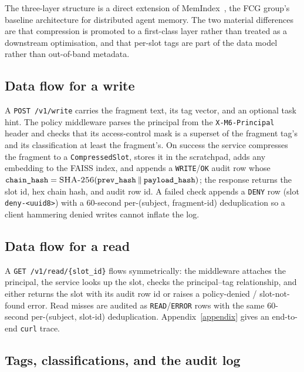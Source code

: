 The three-layer structure is a direct extension of
MemIndex~\cite{saleh2025memindex}, the FCG group's baseline architecture
for distributed agent memory. The two material differences are that
compression is promoted to a first-class layer rather than treated as
a downstream optimisation, and that per-slot tags are part of the
data model rather than out-of-band metadata.

\subsection{Data flow for a write}

A \texttt{POST /v1/write} carries the fragment text, its tag vector,
and an optional task hint. The policy middleware parses the principal
from the \texttt{X-M6-Principal} header and checks that its
access-control mask is a superset of the fragment tag's and its
classification at least the fragment's. On success the service
compresses the fragment to a \texttt{CompressedSlot}, stores it in
the scratchpad, adds any embedding to the FAISS index, and appends a
\texttt{WRITE}/\texttt{OK} audit row whose
$\texttt{chain\_hash}=\textsc{SHA-256}(\texttt{prev\_hash}\mathbin\Vert\texttt{payload\_hash})$;
the response returns the slot id, hex chain hash, and audit row id. A
failed check appends a \texttt{DENY} row (slot \texttt{deny-<uuid8>})
with a $60$-second per-(subject, fragment-id) deduplication so a
client hammering denied writes cannot inflate the log.

\subsection{Data flow for a read}

A \texttt{GET /v1/read/\{slot\_id\}} flows symmetrically: the
middleware attaches the principal, the service looks up the slot,
checks the principal--tag relationship, and either returns the slot
with its audit row id or raises a policy-denied / slot-not-found
error. Read misses are audited as \texttt{READ}/\texttt{ERROR} rows
with the same $60$-second per-(subject, slot-id) deduplication.
Appendix~\ref{appendix} gives an end-to-end \texttt{curl} trace.

\subsection{Tags, classifications, and the audit log}

